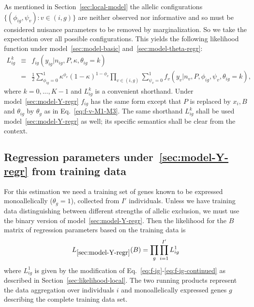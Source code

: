 \documentclass[letterpaper]{article}
\begin{document}
As mentioned in Section~\ref{sec:local-model} the allelic configurations \( \{
(\phi_{ig},\psi_v) : v\in(i,g) \} \) are neither observed nor informative and
so must be considered nuisance parameters to be removed by marginalization.
So we take the expectation over all possible configurations.  This yields the
following likelihood function under model~\ref{sec:model-basic}
and~\ref{sec:model-theta-regr}:
\begin{eqnarray}
\label{eq:f-ig}
L_{ig}^k &\equiv&
f_{ig}(y_{ig} | n_{ig}, P, \kappa, \theta_{ig}=k)
\\
\label{eq:f-ig-continued}
&=&
\frac{1}{2}
\sum_{\phi_{ig}=0}^1 \kappa^{\phi_v} (1 - \kappa)^{1-\phi_v}
\prod_{v\in(i,g)}
\sum_{\psi_v=0}^1
f_v(y_v | n_v, P, \phi_{ig}, \psi_v, \theta_{ig}=k),
\end{eqnarray}
where \(k=0,...,K-1\) and \(L_{ig}^k\) is a convenient shorthand.  Under
model~\ref{sec:model-Y-regr} \(f_{ig}\) has the same form except that \(P\) is
replaced by \(x_i,B\) and \(\theta_{ig}\) by \(\theta_g\) as in
Eq.~\ref{eq:f-v-M1-M3}.  The same shorthand \(L_{ig}^k\) shall
be used model~\ref{sec:model-Y-regr} as well; its specific semantics shall be clear from
the context.

\subsection{Regression parameters under~\ref{sec:model-Y-regr} from training data}
\label{sec:beta-from-training-data}

For this estimation we need a training set of genes known to be expressed
monoallelically (\(\theta_g=1\)), collected
from \(I'\) individuals.  Unless we have training data distinguishing between
different strengths of allelic exclusion, we must use the binary version of
model~\ref{sec:model-Y-regr}.  Then the likelihood for the \(B\) matrix of regression
parameters based on the training data is
\begin{eqnarray}
L_{\ref{sec:model-Y-regr}}(B) = \prod_{g} \prod_{i=1}^{I'} L_{ig}^1
\end{eqnarray}
where \(L_{ig}^1\) is given by the modification of
Eq.~\ref{eq:f-ig}-\ref{eq:f-ig-continued} as described in
Section~\ref{sec:likelihood-local}.  The two running products represent the
data aggregation over individuals \(i\) and monoallelically expressed genes
\(g\) describing the complete training data set.
\end{document}
